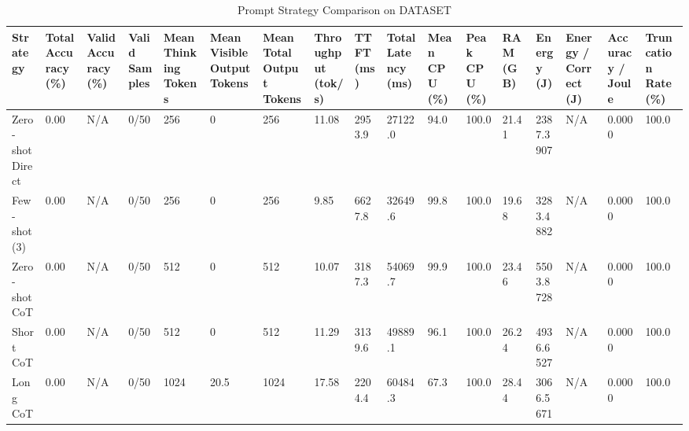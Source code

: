\begin{table}
\caption{Prompt Strategy Comparison on DATASET}
\label{tab:strategy_comparison}
\begin{tabular}{lllllllllllllllll}
\toprule
Strategy & Total Accuracy (\%) & Valid Accuracy (\%) & Valid Samples & Mean Thinking Tokens & Mean Visible Output Tokens & Mean Total Output Tokens & Throughput (tok/s) & TTFT (ms) & Total Latency (ms) & Mean CPU (\%) & Peak CPU (\%) & RAM (GB) & Energy (J) & Energy / Correct (J) & Accuracy / Joule & Truncation Rate (\%) \\
\midrule
Zero-shot Direct & 0.00 & N/A & 0/50 & 256 & 0 & 256 & 11.08 & 2953.9 & 27122.0 & 94.0 & 100.0 & 21.41 & 2387.3907 & N/A & 0.0000 & 100.0 \\
Few-shot (3) & 0.00 & N/A & 0/50 & 256 & 0 & 256 & 9.85 & 6627.8 & 32649.6 & 99.8 & 100.0 & 19.68 & 3283.4882 & N/A & 0.0000 & 100.0 \\
Zero-shot CoT & 0.00 & N/A & 0/50 & 512 & 0 & 512 & 10.07 & 3187.3 & 54069.7 & 99.9 & 100.0 & 23.46 & 5503.8728 & N/A & 0.0000 & 100.0 \\
Short CoT & 0.00 & N/A & 0/50 & 512 & 0 & 512 & 11.29 & 3139.6 & 49889.1 & 96.1 & 100.0 & 26.24 & 4936.6527 & N/A & 0.0000 & 100.0 \\
Long CoT & 0.00 & N/A & 0/50 & 1024 & 20.5 & 1024 & 17.58 & 2204.4 & 60484.3 & 67.3 & 100.0 & 28.44 & 3066.5671 & N/A & 0.0000 & 100.0 \\
\bottomrule
\end{tabular}
\end{table}
